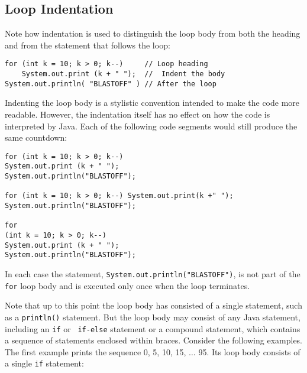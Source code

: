 
\subsection{Loop Indentation}
\noindent Note how indentation is used to distinguish the loop body
from both the heading and from the statement that follows the loop:

\begin{jjjlisting}
\begin{lstlisting}
for (int k = 10; k > 0; k--)     // Loop heading
    System.out.print (k + " ");  //  Indent the body
System.out.println( "BLASTOFF" ) // After the loop
\end{lstlisting}
\end{jjjlisting}

\noindent Indenting the loop body is a stylistic convention intended
to make the code more readable.  However, the indentation itself has no
effect on how the code is interpreted by Java.  Each of the following
code segments would still produce the same countdown:

\begin{jjjlisting}
\begin{lstlisting}
for (int k = 10; k > 0; k--)
System.out.print (k + " ");
System.out.println("BLASTOFF");

for (int k = 10; k > 0; k--) System.out.print(k +" ");
System.out.println("BLASTOFF");

for
(int k = 10; k > 0; k--)
System.out.print (k + " ");
System.out.println("BLASTOFF");
\end{lstlisting}
\end{jjjlisting}

\noindent In each case the statement, \verb|System.out.println("BLASTOFF")|,
is not part of the {\tt for} loop body and is executed only once when the
loop terminates.



\noindent Note that up to this point the loop body has consisted of a
single statement, such as a {\tt println()} statement. But the loop
body may consist of any Java statement, including an {\tt if} or {\tt
if-else} statement or a compound statement, which contains a sequence
of statements enclosed within braces.  Consider the following
examples.  The first example prints the sequence 0, 5, 10, 15, $\dots$
95. Its loop body consists of a single {\tt if} statement:


